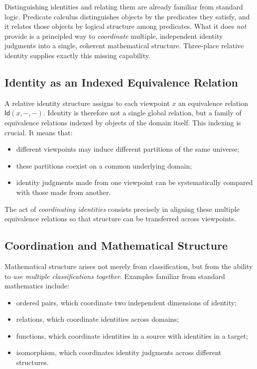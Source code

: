 \documentclass{ws-rv9x6}
\theoremstyle{remark}
\newcommand{\Id}{\mathsf{Id}}
\begin{document}
Distinguishing identities and relating them are already familiar from standard logic. Predicate calculus distinguishes objects by the predicates they satisfy, and it relates those objects by logical structure among predicates. What it does \emph{not} provide is a principled way to \emph{coordinate} multiple, independent identity judgments into a single, coherent mathematical structure. Three-place relative identity supplies exactly this missing capability.

\subsection{Identity as an Indexed Equivalence Relation}

A relative identity structure assigns to each viewpoint $x$ an equivalence relation $\Id(x,-,-)$. Identity is therefore not a single global relation, but a family of equivalence relations indexed by objects of the domain itself. This indexing is crucial. It means that:
\begin{itemize}
    \item different viewpoints may induce different partitions of the same universe;
    \item these partitions coexist on a common underlying domain;
    \item identity judgments made from one viewpoint can be systematically compared with those made from another.
\end{itemize}

The act of \emph{coordinating identities} consists precisely in aligning these multiple equivalence relations so that structure can be transferred across viewpoints.

\subsection{Coordination and Mathematical Structure}

Mathematical structure arises not merely from classification, but from the ability to \emph{use multiple classifications together}. Examples familiar from standard mathematics include:
\begin{itemize}
    \item ordered pairs, which coordinate two independent dimensions of identity;
    \item relations, which coordinate identities across domains;
    \item functions, which coordinate identities in a source with identities in a target;
    \item isomorphism, which coordinates identity judgments across different structures.
\end{itemize}
\end{document}
